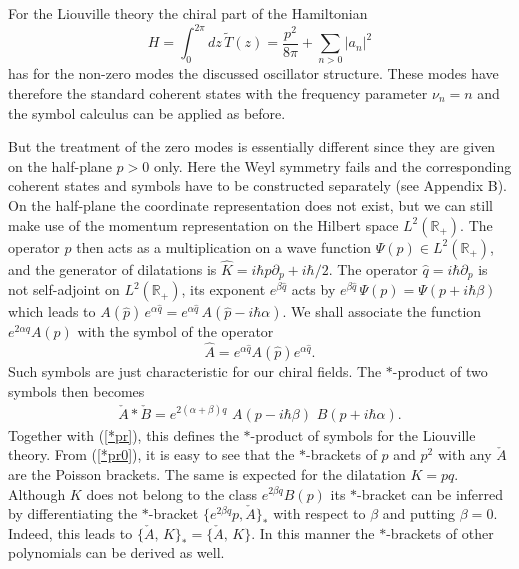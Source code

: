 \documentclass[a4paper,12pt]{article}
\newcommand{\rr}{\mathbb{R}}
\begin{document}
\noindent
For the Liouville theory the chiral part of the Hamiltonian
\begin{equation}\label{H_L}
H =\int_0^{2\pi}dz\,\tilde T(z)=\frac{p^2}{8\pi}+\sum_{n>0}|a_n|^2
\end{equation}
has for the non-zero modes the discussed oscillator structure. These
modes have therefore the standard coherent states with the frequency
parameter $\nu_n=n$ and the symbol calculus can be applied as before.

\noindent
But the treatment of the zero modes is essentially different since they
are given on the half-plane $p>0$ only. Here the Weyl
symmetry fails and the corresponding coherent states and symbols have
to be constructed
separately (see Appendix B).
On the half-plane the coordinate representation
does not exist, but we can still
make use of the
momentum representation on the Hilbert space $L^2(\rr_+)$.
The operator $\hat p$  then acts as a multiplication on a wave function
$\Psi (p)\in L^2(\rr_+)$, and the generator of dilatations  is
$\hat K=i\hbar p\partial_p +i\hbar/2$.
The operator $\hat q=i\hbar\partial_p$ is not self-adjoint on
$L^2(\rr_+)$,  its exponent  $e^{\beta\hat q}$ acts by
$e^{\beta\hat q}\,\Psi (p)=\Psi (p+i\hbar \beta)$
which leads to $A(\hat p)\,e^{\alpha\hat q}=
e^{\alpha\hat q}\,A(\hat p-i\hbar \alpha)$.
We shall associate the function $e^{2\alpha q}A(p)$ with the symbol of the
operator
\begin{equation}\label{hatA}
\hat A=e^{\alpha\hat q}A(\hat p)e^{\alpha\hat q}.
\end{equation}
Such symbols are just characteristic for our chiral fields.
The $*$-product
of two symbols then becomes
\begin{eqnarray}\label{*pr0}
{\check A} *{\check B} = e^{2(\alpha+\beta)q}\,\,
{ A}(p-i\hbar \beta)
\,\,{B}(p+i\hbar \alpha).
\end{eqnarray}
Together with (\ref{*pr}), this defines the $*$-product of symbols for
the Liouville theory.  From (\ref{*pr0}), it is easy to see that the
$*$-brackets of $p$ and $p^2$ with any $\check A$ are the Poisson
brackets.  The same is expected for the dilatation $K=pq$. Although
$K$ does not belong to the class $e^{2\beta q}B(p)$ its $*$-bracket
can be inferred by differentiating the $*$-bracket $\{e^{2\beta q}p, \check
A\}_*$ with respect to $\beta$ and putting $\beta =0$. Indeed, this
leads to $\{{\check A},\,K\}_*= \{{\check A},\,K\}$. In this manner
the $*$-brackets of other polynomials can be derived as well.
\end{document}
